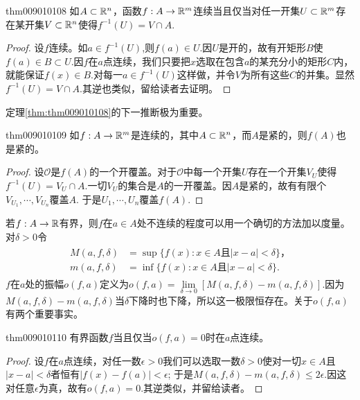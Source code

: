 \begin{theorem}{}{thm009010108}
如$A \subset \mathbb{R}^n$，函数$f:A \to \mathbb{R}^m$连续当且仅当对任一开集$U \subset \mathbb{R}^m$存在某开集$V \subset \mathbb{R}^n$使得$f^{-1}(U) = V \cap A$.
\end{theorem}

\begin{proof}
设$f$连续。如$a \in f^{-1}(U)$,则$f(a) \in U$.因$U$是开的，故有开矩形$B$使$f(a) \in B \subset U$.因$f$在$a$点连续，我们只要把$x$选取在包含$a$的某充分小的矩形$C$内，就能保证$f(x) \in B$.对每一$a \in f^{-1}(U)$这样做，并令$V$为所有这些$C$的并集。显然$f^{-1}(U) = V \cap A$.其逆也类似，留给读者去证明。
\end{proof}

定理\ref{thm:thm009010108}的下一推断极为重要。
\begin{theorem}{}{thm009010109}
如$f:A \to \mathbb{R}^m$是连续的，其中$A \subset \mathbb{R}^n$，而$A$是紧的，则$f(A)$也是紧的。
\end{theorem}

\begin{proof}
设$\mathscr{O}$是$f(A)$的一个开覆盖。对于$\mathscr{O}$中每一个开集$U$存在一个开集$V_U$使得$f^{-1}(U) = V_U \cap A$.一切$V_U$的集合是$A$的一开覆盖。因$A$是紧的，故有有限个$V_{U_1}, \cdots, V_{U_n}$覆盖$A$. 于是$U_1, \cdots, U_n$覆盖$f(A)$.
\end{proof}

若$f:A \to \mathbb{R}$有界，则$f$在$a \in A$处不连续的程度可以用一个确切的方法加以度量。对$\delta > 0$令
\begin{gather*}
\begin{aligned}
M(a,f,\delta) &= \sup\{f(x):x \in A\text{且}|x-a|<\delta\}，\\
m(a,f,\delta) &= \inf\{f(x):x \in A\text{且}|x-a|<\delta\}.
\end{aligned}
\end{gather*}
$f$在$a$处的振幅$o(f,a)$定义为$o(f,a) = \lim\limits_{\delta \to 0}{[M(a,f,\delta) - m(a,f,\delta)]}$.因为$M(a,f,\delta)-m(a,f,\delta)$当$\delta$下降时也下降，所以这一极限恒存在。关于$o(f,a)$有两个重要事实。

\begin{theorem}{}{thm009010110}
有界函数$f$当且仅当$o(f, a)=0$时在$a$点连续。
\end{theorem}

\begin{proof}
设$f$在$a$点连续，对任一数$\epsilon>0$我们可以选取一数$\delta>0$使对一切$x \in A$且$|x-a|<\delta$者恒有$|f(x)-f(a)|<\epsilon$; 于是$M(a,f,\delta) - m(a,f,\delta) \le 2\epsilon$.因这对任意$\epsilon$为真，故有$o(f, a) = 0$.其逆类似，并留给读者。
\end{proof}

